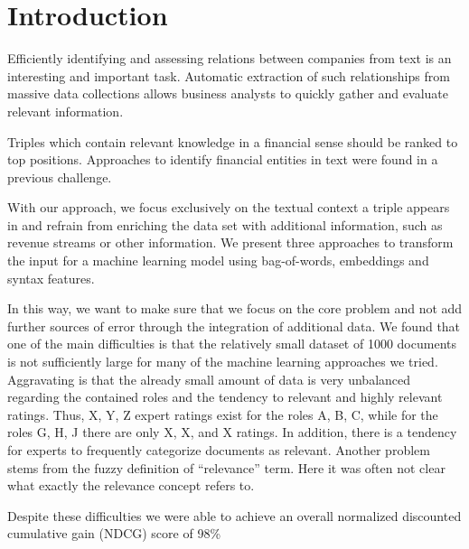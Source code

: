 \section{Introduction}



Efficiently identifying and assessing relations between companies from text is an interesting and important task.
Automatic extraction of such relationships from massive data collections allows business analysts to quickly gather and evaluate relevant information.


Triples which contain relevant knowledge in a financial sense should be ranked to top positions.
Approaches to identify financial entities in text were found in a previous challenge\cite{Samiei:2016:CRT:2951894.2951905}.

With our approach, we focus exclusively on the textual context a triple appears in and refrain from enriching the data set with additional information, such as revenue streams or other information.
We present three approaches to transform the input for a machine learning model using bag-of-words, embeddings and syntax features.





In this way, we want to make sure that we focus on the core problem and not add further sources of error through the integration of additional data.
We found that one of the main difficulties is that the relatively small dataset of 1000 documents is not sufficiently large for many of the machine learning approaches we tried. 
Aggravating is that the already small amount of data is very unbalanced regarding the contained roles and the tendency to relevant and highly relevant ratings.
Thus, X, Y, Z expert ratings exist for the roles A, B, C, while for the roles G, H, J there are only X, X, and X ratings.  
In addition, there is a tendency for experts to frequently categorize documents as relevant.
Another problem stems from the fuzzy definition of ``relevance'' term.
Here it was often not clear what exactly the relevance concept refers to.

Despite these difficulties we were able to achieve an overall normalized discounted cumulative gain (NDCG) score of 98\%

